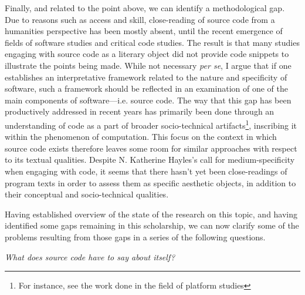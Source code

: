 Finally, and related to the point above, we can identify a methodological gap. Due to reasons such as access and skill, close-reading of source code from a humanities perspective has been mostly absent, until the recent emergence of fields of software studies and critical code studies. The result is that many studies engaging with source code as a literary object did not provide code snippets to illustrate the points being made. While not necessary \emph{per se}, I argue that if one establishes an interpretative framework related to the nature and specificity of software, such a framework should be reflected in an examination of one of the main components of software—i.e. source code. The way that this gap has been productively addressed in recent years has primarily been done through an understanding of code as a part of broader socio-technical artifacts\footnote{For instance, see the work done in the field of platform studies\cite{montfort_10_2014}}, inscribing it within the phenomenon of computation. This focus on the context in which source code exists therefore leaves some room for similar approaches with respect to its textual qualities. Despite N. Katherine Hayles's call for medium-specificity when engaging with code\cite{hayles_print_2004}, it seems that there hasn't yet been close-readings of program texts in order to assess them as specific aesthetic objects, in addition to their conceptual and socio-technical qualities.

Having established overview of the state of the research on this topic, and having identified some gaps remaining in this scholarship, we can now clarify some of the problems resulting from those gaps in a series of the following questions.

\vspace*{1\baselineskip}

\emph{What does source code have to say about itself?}


